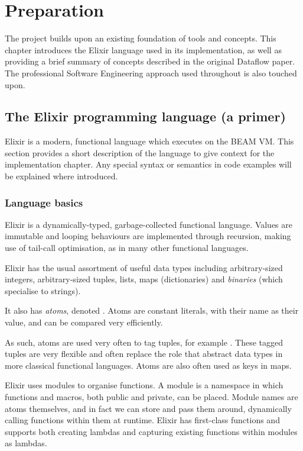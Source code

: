 \chapter{Preparation}\label{ch:prep}

The project builds upon an existing foundation of tools and concepts.
This chapter introduces the Elixir language used in its implementation, as well as providing a brief summary of concepts described in the original Dataflow paper.
The professional Software Engineering approach used throughout is also touched upon.

\section{The Elixir programming language (a primer)}\label{sec:prep:elixir}

Elixir is a modern, functional language which executes on the BEAM VM.
This section provides a short description of the language to give context for the implementation chapter.
Any special syntax or semantics in code examples will be explained where introduced.

\subsection{Language basics}\label{sec:prep:elixir:basics}


Elixir is a dynamically-typed, garbage-collected functional language.
Values are immutable and looping behaviours are implemented through recursion, making use of tail-call optimisation, as in many other functional languages.

Elixir has the usual assortment of useful data types including arbitrary-sized integers, arbitrary-sized tuples, lists, maps (dictionaries) and \emph{binaries} (which specialise to strings).

It also has \emph{atoms}, denoted .
Atoms are constant literals, with their name as their value, and can be compared very efficiently.

As such, atoms are used very often to tag tuples, for example .
These tagged tuples are very flexible and often replace the role that abstract data types in more classical functional languages.
Atoms are also often used as keys in maps.

Elixir uses modules to organise functions.
A module is a namespace in which functions and macros, both public and private, can be placed.
Module names are atoms themselves, and in fact we can store and pass them around, dynamically calling functions within them at runtime.
Elixir has first-class functions and supports both creating lambdas and capturing existing functions within modules as lambdas.

